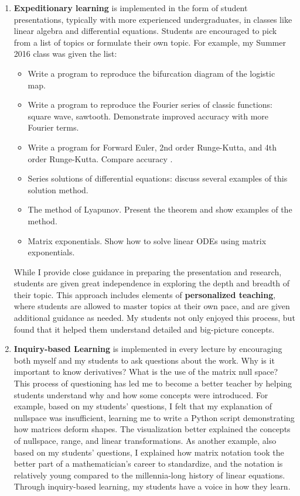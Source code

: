 \documentclass[a4paper,11pt]{article}
\begin{document}
\begin{enumerate}
	\item \textbf{Expeditionary learning} is implemented in the form of student presentations, typically with more experienced undergraduates, in classes like linear algebra and differential equations. Students are encouraged to pick from a list of topics or formulate their own topic. For example, my Summer 2016 class was given the list:
	\begin{itemize}
		\item Write a program to reproduce the bifurcation diagram of the logistic map.
		\item Write a program to reproduce the Fourier series of classic functions: square wave, sawtooth. Demonstrate improved accuracy with more Fourier terms.
		\item Write a program for Forward Euler, 2nd order Runge-Kutta, and 4th order Runge-Kutta. Compare accuracy .
		\item Series solutions of differential equations: discuss several examples of this solution method.
		\item The method of Lyapunov. Present the theorem and show examples of the method.
		\item Matrix exponentials. Show how to solve linear ODEs using matrix exponentials.
	\end{itemize}
	While I provide close guidance in preparing the presentation and research, students are given great independence in exploring the depth and breadth of their topic. This approach includes elements of \textbf{personalized teaching}, where students are allowed to master topics at their own pace, and are given additional guidance as needed. My students not only enjoyed this process, but found that it helped them understand detailed and big-picture concepts.
	
	\item \textbf{Inquiry-based Learning} is implemented in every lecture by encouraging both myself and my students to ask questions about the work. Why is it important to know derivatives? What is the use of the matrix null space? This process of questioning has led me to become a better teacher by helping students understand why and how some concepts were introduced. For example, based on my students' questions, I felt that my explanation of nullspace was insufficient, learning me to write a Python script demonstrating how matrices deform shapes. The visualization better explained the concepts of nullspace, range, and linear transformations. As another example, also based on my students' questions, I explained how matrix notation took the better part of a mathematician's career to standardize, and the notation is relatively young compared to the millennia-long history of linear equations. Through inquiry-based learning, my students have a voice in how they learn.
	

\end{enumerate}
\end{document}

